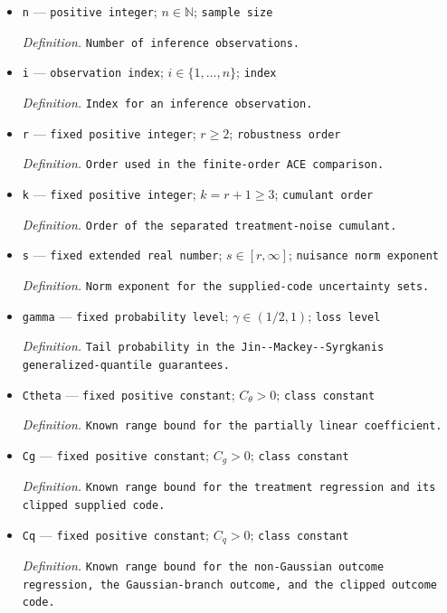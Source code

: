 \documentclass{article}
\begin{document}
\begin{itemize}
  \item \texttt{n} --- \texttt{positive integer}; \(n\in\mathbb N\); \texttt{sample size}
  \par\smallskip\noindent\emph{Definition.} \texttt{Number of inference observations.}
  \item \texttt{i} --- \texttt{observation index}; \(i\in\{1,\ldots,n\}\); \texttt{index}
  \par\smallskip\noindent\emph{Definition.} \texttt{Index for an inference observation.}
  \item \texttt{r} --- \texttt{fixed positive integer}; \(r\ge2\); \texttt{robustness order}
  \par\smallskip\noindent\emph{Definition.} \texttt{Order used in the finite-\allowbreak{}order ACE comparison.}
  \item \texttt{k} --- \texttt{fixed positive integer}; \(k=r+1\ge3\); \texttt{cumulant order}
  \par\smallskip\noindent\emph{Definition.} \texttt{Order of the separated treatment-\allowbreak{}noise cumulant.}
  \item \texttt{s} --- \texttt{fixed extended real number}; \(s\in[r,\infty]\); \texttt{nuisance norm exponent}
  \par\smallskip\noindent\emph{Definition.} \texttt{Norm exponent for the supplied-\allowbreak{}code uncertainty sets.}
  \item \texttt{gamma} --- \texttt{fixed probability level}; \(\gamma\in(1/2,1)\); \texttt{loss level}
  \par\smallskip\noindent\emph{Definition.} \texttt{Tail probability in the Jin-\allowbreak{}-\allowbreak{}Mackey-\allowbreak{}-\allowbreak{}Syrgkanis generalized-\allowbreak{}quantile guarantees.}
  \item \texttt{Ctheta} --- \texttt{fixed positive constant}; \(C_{\theta}>0\); \texttt{class constant}
  \par\smallskip\noindent\emph{Definition.} \texttt{Known range bound for the partially linear coefficient.}
  \item \texttt{Cg} --- \texttt{fixed positive constant}; \(C_g>0\); \texttt{class constant}
  \par\smallskip\noindent\emph{Definition.} \texttt{Known range bound for the treatment regression and its clipped supplied code.}
  \item \texttt{Cq} --- \texttt{fixed positive constant}; \(C_q>0\); \texttt{class constant}
  \par\smallskip\noindent\emph{Definition.} \texttt{Known range bound for the non-\allowbreak{}Gaussian outcome regression,\allowbreak{} the Gaussian-\allowbreak{}branch outcome,\allowbreak{} and the clipped outcome code.}

\end{itemize}
\end{document}
